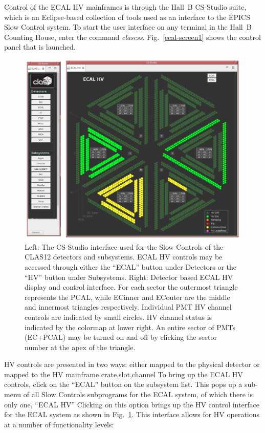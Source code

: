 \documentclass[letterpaper,10pt]{article}
\begin{document}
Control of the ECAL HV mainframes is through the Hall~B CS-Studio suite, which is an Eclipse-based collection 
of tools used as an interface to the EPICS Slow Control system. To start the user interface on any 
terminal in the Hall~B Counting House, enter the command {\it clascss}. Fig.~\ref{ecal-screen1} 
shows the control panel that is launched.
\begin{figure}[htbp]
  \centering
  \includegraphics[width= 6in, keepaspectratio = true]{cssclas-detector-interface}
  \vspace{2mm}
  \caption{Left: The CS-Studio interface used for the Slow Controls of the CLAS12 detectors and subsystems.  ECAL HV
    controls may be accessed through either the ``ECAL'' button under Detectors or the ``HV'' button under Subsystems.
  Right: Detector based ECAL HV display and control interface. For each sector the outermost triangle represents the PCAL, while
  ECinner and ECouter are the middle and innermost triangles respectively. Individual PMT HV channel controls
  are indicated by small circles. HV channel status is indicated by the colormap at lower right.  An entire sector
  of PMTs (EC+PCAL) may be turned on and off by clicking the sector number at the apex of the triangle.}
  \label{ecal-screen}
\end{figure}

HV controls are presented in two ways: either mapped to the physical detector or mapped to the HV mainframe
crate,slot,channel
To bring up the ECAL HV controls, click on the ``ECAL'' button on the subsystem list. This pops up a 
sub-menu of all Slow Controls subprograms for the ECAL system, of which there is only one, ``ECAL HV'' 
Clicking on this option brings up the HV control interface for the ECAL system as shown in
Fig.~\ref{ecal-screen}. This interface allows for HV operations at a number of functionality levels:
\end{document}
